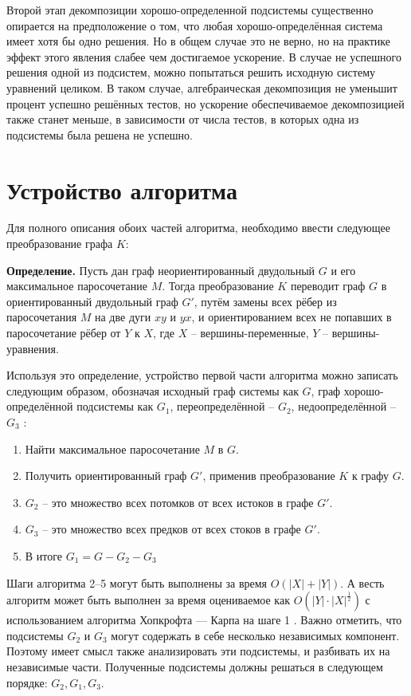 Второй этап декомпозиции хорошо-определенной подсистемы существенно опирается на предположение о том, что любая хорошо-определённая система имеет хотя бы одно решения. Но в общем случае это не верно, но на практике эффект этого явления слабее чем достигаемое ускорение. В случае не успешного решения одной из подсистем, можно попытаться решить исходную систему уравнений целиком. В таком случае, алгебраическая декомпозиция не уменьшит процент успешно решённых тестов, но ускорение обеспечиваемое декомпозицией также станет меньше, в зависимости от числа тестов, в которых одна из подсистемы была решена не успешно. 

\section{Устройство алгоритма}

Для полного описания обоих частей алгоритма, необходимо ввести следующее преобразование графа $K$:

\textbf{Определение.} Пусть дан граф неориентированный двудольный $G$ и его максимальное паросочетание $M$. Тогда преобразование $K$ переводит граф $G$ в ориентированный двудольный граф $G'$, путём замены всех рёбер из паросочетания $M$ на две дуги $xy$ и $yx$, и ориентированием всех не попавших в паросочетание рёбер от $Y$ к $X$, где $X$ -- вершины-переменные, $Y$ -- вершины-уравнения.

Используя это определение, устройство первой части алгоритма можно записать следующим образом, обозначая исходный граф системы как $G$, граф хорошо-определённой подсистемы как $G_1$,  переопределённой  -- $G_2$, недоопределённой -- $G_3$ \cite{ait2014reduction}:
\begin{enumerate}
    \item 
        Найти максимальное паросочетание $M$ в $G$.
    \item
        Получить ориентированный граф $G'$, применив преобразование $K$ к графу $G$.
    \item
        $G_2$ -- это множество всех потомков от всех истоков в графе $G'$.
    \item
        $G_3$ -- это множество всех предков от всех стоков в графе $G'$.
    \item
        В итоге $G_1 = G - G_2 - G_3$ 
\end{enumerate}
Шаги алгоритма 2--5 могут быть выполнены за время $O(|X| + |Y|)$. А весть алгоритм может быть выполнен за время оцениваемое как $O(|Y|\cdot |X|^\frac{1}{2})$ с использованием алгоритма Хопкрофта — Карпа на шаге 1 \cite{hopcroft1973n}. Важно отметить, что подсистемы $G_2$ и $G_3$ могут содержать в себе несколько независимых компонент. Поэтому имеет смысл также анализировать эти подсистемы, и разбивать их на независимые части. Полученные подсистемы должны решаться в следующем порядке: $G_2, G_1, G_3$.

